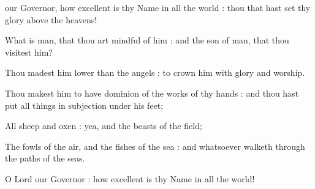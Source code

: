 
 our Governor, how excellent is thy Name in all the world : thou that hast set thy glory above the heavens!\par
{}
What is man, that thou art mindful of him : and the son of man, that thou visitest him?\par
{}Thou madest him lower than the angels : to crown him with glory and worship.\par
{}Thou makest him to have dominion of the works of thy hands : and thou hast put all things in subjection under his feet;\par
{}All sheep and oxen : yea, and the beasts of the field;\par
{}The fowls of the air, and the fishes of the sea : and whatsoever walketh through the paths of the seas.\par
{}O Lord our Governor : how excellent is thy Name in all the world!\par



